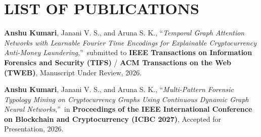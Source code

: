 \chapter*{LIST OF PUBLICATIONS}

\begin{enumerate}[label={[\arabic*]}]
    \item \textbf{Anshu Kumari}, Janani V. S., and Aruna S. K., \textquotedblleft\textit{Temporal Graph Attention Networks with Learnable Fourier Time Encodings for Explainable Cryptocurrency Anti-Money Laundering},\textquotedblright\ submitted to \textbf{IEEE Transactions on Information Forensics and Security (TIFS)} / \textbf{ACM Transactions on the Web (TWEB)}, Manuscript Under Review, 2026.
    
    \item \textbf{Anshu Kumari}, Janani V. S., and Aruna S. K., \textquotedblleft\textit{Multi-Pattern Forensic Typology Mining on Cryptocurrency Graphs Using Continuous Dynamic Graph Neural Networks},\textquotedblright\ in \textbf{Proceedings of the IEEE International Conference on Blockchain and Cryptocurrency (ICBC 2027)}, Accepted for Presentation, 2026.
\end{enumerate}

\clearpage